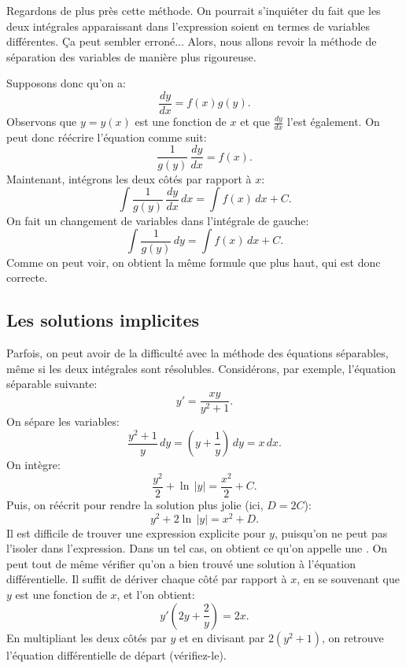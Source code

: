 Regardons de plus près cette méthode.  On pourrait s'inquiéter du fait que les deux intégrales apparaissant dans l'expression soient en termes de variables différentes.  Ça peut sembler erroné... Alors, nous allons revoir la méthode de séparation des variables de manière plus rigoureuse.

Supposons donc qu'on a:
\begin{equation*}
	\frac{dy}{dx} = f(x)g(y) .
\end{equation*}
Observons que $y = y(x)$ est une fonction de $x$ et que
$\frac{dy}{dx}$ l'est également.  On peut donc réécrire l'équation comme suit:
\begin{equation*}
	\frac{1}{g(y)}\,\frac{dy}{dx} = f(x) .
\end{equation*}
Maintenant, intégrons les deux côtés par rapport à $x$:
\begin{equation*}
	\int \frac{1}{g(y)}\,\frac{dy}{dx} \,dx = \int f(x) \,dx + C .
\end{equation*}
On fait un changement de variables dans l'intégrale de gauche:
\begin{equation*}
	\int \frac{1}{g(y)}\,dy = \int f(x) \,dx + C .
\end{equation*}
Comme on peut voir, on obtient la même formule que plus haut, qui est donc correcte.




\subsection{Les solutions implicites}

Parfois, on peut avoir de la difficulté avec la méthode des équations séparables,
même si les deux intégrales sont résolubles.
Considérons, par exemple, l'équation séparable suivante:
\begin{equation*}
	y' = \frac{xy}{y^2+1} .
\end{equation*}
On sépare les variables:
\begin{equation*}
	\frac{y^2+1}{y}\,dy = \left(y+\frac{1}{y}\right)\,dy = x\,dx .
\end{equation*}
On intègre:
\begin{equation*}
	\frac{y^2}{2} + \ln \, \lvert y \rvert = \frac{x^2}{2} + C.
\end{equation*}
Puis, on réécrit pour rendre la solution plus jolie (ici, $D = 2C$):
\begin{equation*}
	y^2 + 2 \ln \, \lvert y\rvert = x^2 + D .
\end{equation*}
Il est difficile de trouver une expression explicite pour $y$, puisqu'on ne peut pas l'isoler dans l'expression.
Dans un tel cas, on obtient ce qu'on appelle une
\emph{}.
On peut tout de même vérifier qu'on a bien trouvé une solution à l'équation différentielle.
Il suffit de dériver chaque côté par rapport à $x$, en se souvenant que $y$ est une fonction de $x$, et l'on obtient:
\begin{equation*}
	y'\left(2y + \frac{2}{y}\right) = 2x .
\end{equation*}
En multipliant les deux côtés par $y$ et en divisant par $2(y^2+1)$, on retrouve l'équation différentielle de départ (vérifiez-le).

